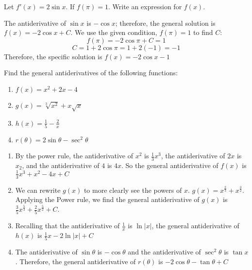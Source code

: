 \begin{Exercise}[label=antideriv2]
	Let $f'(x) = 2\sin{x}$. If $f(\pi) = 1$. Write an expression for 
	$f(x)$. 
\end{Exercise}

\begin{Answer}[ref=antideriv2]
	The antiderivative of $\sin{x}$ is $-\cos{x}$; therefore, the 
	general solution is $f(x) = -2\cos{x} + C$. We use the given 
	condition, $f(\pi) = 1$ to find $C$:
	$$f(\pi) = -2\cos{\pi} + C = 1$$
	$$C = 1 + 2\cos{\pi} = 1 + 2(-1) = -1$$
	Therefore, the specific solution is $f(x) = -2\cos{x} - 1$
\end{Answer}

\begin{Exercise}[label=antideriv3]
	Find the general antiderivatives of the following functions:
	\begin{enumerate}
	\item $f(x) = x^2 + 2x - 4$
	\item $g(x) = \sqrt[3]{x^2} + x\sqrt{x}$
	\item $h(x) = \frac{1}{5} - \frac{2}{x}$
	\item $r(\theta) = 2\sin{\theta} - \sec^2{\theta}$
	\end{enumerate} 	
\end{Exercise}

\begin{Answer}[ref=antideriv3]
	\begin{enumerate}
	\item By the power rule, the antiderivative of $x^2$ is 
	$\frac{1}{3}x^3$, the antiderivative of $2x$ is $x_2$, and the 
	antiderivative of $4$ is $4x$. So the general antiderivative of $f(x)$ 
	is $\frac{1}{3}x^3 + x^2 - 4x + C$
	\item We can rewrite $g(x)$ to more clearly see the powers of $x$. 
	$g(x) = x^{\frac{2}{3}} + x^{\frac{3}{2}}$. Applying the Power rule, 
	we find the general antiderivative of $g(x)$ is 
	$\frac{3}{5}x^{\frac{5}{3}} + \frac{2}{5}x^{\frac{5}{2}} + C$. 
	\item Recalling that the antiderivative of $\frac{1}{x}$ is 
	$\ln{|x|}$, the general antiderivative of $h(x)$ is $\frac{1}{5}x - 
	2\ln{|x|} + C$
	\item The antiderivative of $\sin{\theta}$ is $-\cos{\theta}$ and the 
	antiderivative of $\sec^2{\theta}$ is $\tan{x}$. Therefore, the 
	general antiderivative of $r(\theta)$ is $-2\cos{\theta} - 
	\tan{\theta} + C$
	\end{enumerate}
\end{Answer}

